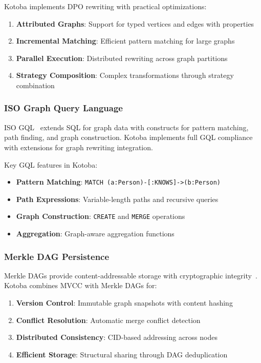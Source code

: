 \documentclass[11pt,a4paper]{article}
\begin{document}
Kotoba implements DPO rewriting with practical optimizations:
\begin{enumerate}
\item \textbf{Attributed Graphs}: Support for typed vertices and edges with properties
\item \textbf{Incremental Matching}: Efficient pattern matching for large graphs
\item \textbf{Parallel Execution}: Distributed rewriting across graph partitions
\item \textbf{Strategy Composition}: Complex transformations through strategy combination
\end{enumerate}

\subsubsection{ISO Graph Query Language}
\label{subsubsec:gql}

ISO GQL~\cite{iso_gql} extends SQL for graph data with constructs for pattern matching, path finding, and graph construction. Kotoba implements full GQL compliance with extensions for graph rewriting integration.

Key GQL features in Kotoba:
\begin{itemize}
\item \textbf{Pattern Matching}: \verb|MATCH (a:Person)-[:KNOWS]->(b:Person)|
\item \textbf{Path Expressions}: Variable-length paths and recursive queries
\item \textbf{Graph Construction}: \verb|CREATE| and \verb|MERGE| operations
\item \textbf{Aggregation}: Graph-aware aggregation functions
\end{itemize}

\subsubsection{Merkle DAG Persistence}
\label{subsubsec:merkle}

Merkle DAGs provide content-addressable storage with cryptographic integrity~\cite{merkle_dag}. Kotoba combines MVCC with Merkle DAGs for:

\begin{enumerate}
\item \textbf{Version Control}: Immutable graph snapshots with content hashing
\item \textbf{Conflict Resolution}: Automatic merge conflict detection
\item \textbf{Distributed Consistency}: CID-based addressing across nodes
\item \textbf{Efficient Storage}: Structural sharing through DAG deduplication
\end{enumerate}
\end{document}
